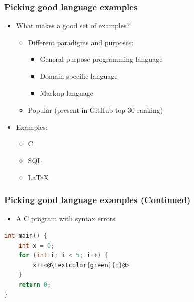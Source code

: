 \documentclass[t,24pt,aspectratio=169]{beamer}
\begin{document}
\begin{frame}[hvid]
    \frametitle{Picking good language examples}
    \begin{itemize}
        \item What makes a good set of examples?
              \begin{itemize}
                  \item Different paradigms and purposes:
                        \begin{itemize}
                            \item General purpose programming language
                            \item Domain-specific language
                            \item Markup language
                        \end{itemize}
                  \item Popular (present in GitHub top 30 ranking)
              \end{itemize}
              \pause
        \item Examples:
              \begin{itemize}
                  \item C
                  \item SQL
                  \item \LaTeX
              \end{itemize}
    \end{itemize}
\end{frame}

\begin{frame}[fragile]
    \frametitle{Picking good language examples (Continued)}

    \begin{multicols}{2}
        \begin{itemize}
            \item A C program with syntax errors

        \end{itemize}
        \columnbreak
        \begin{lstlisting}[language=c]
int main() {
    int x = 0;
    for (int i; i < 5; i++) {
        x++<@\textcolor{green}{;}@>
    }
    return 0;
}
    \end{lstlisting}
    \end{multicols}
\end{frame}
\end{document}
